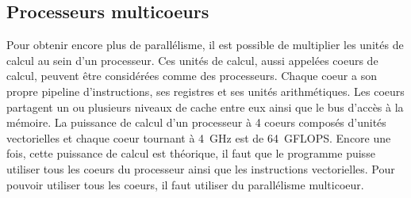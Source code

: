 \subsection{Processeurs multicoeurs}
Pour obtenir encore plus de parallélisme, il est possible de multiplier les unités de calcul au sein d'un processeur.
%
Ces unités de calcul, aussi appelées coeurs de calcul, peuvent être considérées comme des processeurs.
%
Chaque coeur a son propre pipeline d'instructions, ses registres et ses unités arithmétiques.
%
Les coeurs partagent un ou plusieurs niveaux de cache entre eux ainsi que le bus d'accès à la mémoire.
%
La puissance de calcul d'un processeur à 4 coeurs composés d'unités vectorielles et chaque coeur tournant à 4~GHz est de 64~GFLOPS.
%
Encore une fois, cette puissance de calcul est théorique, il faut que le programme puisse utiliser tous les coeurs du processeur ainsi que les instructions vectorielles.
%
Pour pouvoir utiliser tous les coeurs, il faut utiliser du parallélisme multicoeur.
